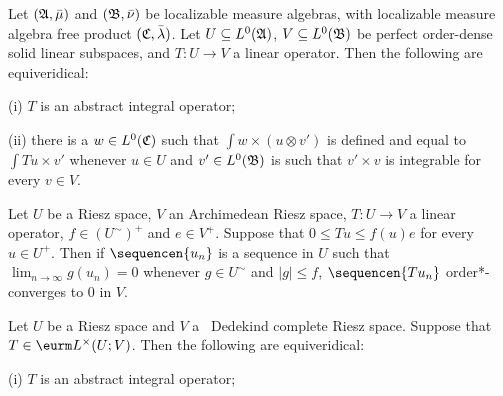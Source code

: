 Let $(\frak A,\bar\mu)$ and
$(\frak B,\bar\nu)$
be localizable measure algebras, with localizable measure algebra free
product $(\frak C,\bar\lambda)$.   Let $U\subseteq L^0(\frak A)$,
$V\subseteq L^0(\frak B)$ be perfect order-dense solid linear subspaces,
and $T:U\to V$ a linear operator.   Then the following are
equiveridical:

(i) $T$ is an abstract integral operator;

(ii) there is a $w\in L^0(\frak C)$ such that $\int w\times(u\otimes
v')$ is defined and equal to $\int Tu\times v'$ whenever $u\in U$ and
$v'\in L^0(\frak B)$ is such that $v'\times v$ is integrable for every
$v\in V$.


 Let $U$ be a Riesz space, $V$ an Archimedean Riesz
space, $T:U\to V$ a linear operator, $f\in (U^{\sim})^+$ and $e\in V^+$.
Suppose that $0\le Tu\le f(u)e$ for every $u\in U^+$.   Then if
$\sequencen{u_n}$ is a sequence in $U$ such that
$\lim_{n\to\infty}g(u_n)=0$ whenever $g\in U^{\sim}$ and $|g|\le f$,
$\sequencen{Tu_n}$ order*-converges to $0$ in
$V$.


 Let $U$ be a Riesz space and $V$ a
\wsid\ Dedekind complete Riesz space.
Suppose that $T\in\eurm L^{\times}(U;V)$.
Then the following are equiveridical:

(i) $T$ is an abstract integral operator;

